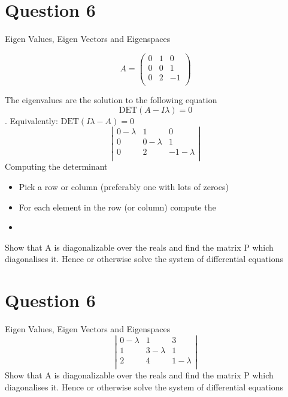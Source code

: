 \documentclass[11pt,a4paper,titlepage,oneside,openany]{article}
\numberwithin{equation}{section}
\numberwithin{algorithm}{section}
\numberwithin{figure}{section}
\numberwithin{table}{section}
\begin{document}
\section*{Question 6}
Eigen Values, Eigen Vectors and Eigenspaces

\[
A = \left(
  \begin{array}{ccc}
 0&  1&  0\\
 0&  0&  1\\
 0&  2& -1\\
  \end{array}
\right)
\]
 
The eigenvalues are the solution to the following equation \[ \mbox{DET}(A-I\lambda) = 0 \].
Equivalently: $ \mbox{DET}(I\lambda-A) = 0 $
\[
\left|
  \begin{array}{ccc}
    0-\lambda & 1 & 0  \\
    0 & 0-\lambda & 1  \\
    0 & 2 & -1-\lambda  \\
  \end{array}
\right|
\]
Computing the determinant
\begin{itemize}
\item Pick a row or column (preferably one with lots of zeroes)
\item For each element in the row (or column) compute the 
\item
\end{itemize}


Show that A is diagonalizable over the reals and find the matrix P which diagonalises it. Hence or otherwise solve the system of differential equations
\newpage




\section*{Question 6}
Eigen Values, Eigen Vectors and Eigenspaces
\[
\left|
  \begin{array}{ccc}
    0-\lambda & 1 & 3  \\
    1 & 3-\lambda & 1  \\
    2 & 4 & 1-\lambda  \\
  \end{array}
\right|
\]
Show that A is diagonalizable over the reals and find the matrix P which diagonalises it. Hence or otherwise solve the system of differential equations
\newpage
\end{document}
